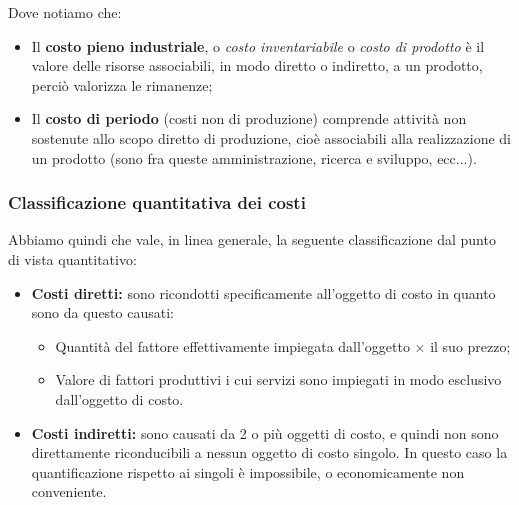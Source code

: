 \documentclass[a4paper,11pt]{article}
\begin{document}
Dove notiamo che:
\begin{itemize}
	\item Il \textbf{costo pieno industriale}, o \textit{costo inventariabile} o \textit{costo di prodotto} è il valore delle risorse associabili, in modo diretto o indiretto, a un prodotto, perciò valorizza le rimanenze;
	\item Il \textbf{costo di periodo} (costi non di produzione) comprende attività non sostenute allo scopo diretto di produzione, cioè associabili alla realizzazione di un prodotto (sono fra queste amministrazione, ricerca e sviluppo, ecc...).
\end{itemize}

\subsubsection{Classificazione quantitativa dei costi}

Abbiamo quindi che vale, in linea generale, la seguente classificazione dal punto di vista quantitativo:
\begin{itemize}
	\item \textbf{Costi diretti:} sono ricondotti specificamente all'oggetto di costo in quanto sono da questo causati:
		\begin{itemize}
			\item Quantità del fattore effettivamente impiegata dall'oggetto $\times$ il suo prezzo;
			\item Valore di fattori produttivi i cui servizi sono impiegati in modo esclusivo dall'oggetto di costo.
		\end{itemize}
	\item \textbf{Costi indiretti:} sono causati da 2 o più oggetti di costo, e quindi non sono direttamente riconducibili a nessun oggetto di costo singolo.
		In questo caso la quantificazione rispetto ai singoli è impossibile, o economicamente non conveniente.
\end{itemize}
\end{document}
